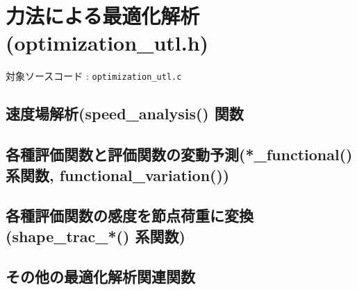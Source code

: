 \documentclass[a4paper,10pt]{jarticle}
\begin{document}
\section{力法による最適化解析(optimization\_utl.h)}
対象ソースコード : \verb|optimization_utl.c|

\subsection{速度場解析(speed\_analysis() 関数}

\subsection{各種評価関数と評価関数の変動予測(*\_functional() 系関数, functional\_variation())}

\subsection{各種評価関数の感度を節点荷重に変換(shape\_trac\_*() 系関数)}

\subsection{その他の最適化解析関連関数}
\end{document}
